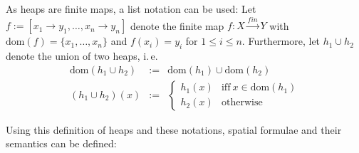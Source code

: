\documentclass{scrartcl}
\theoremstyle{definition}
\newcommand{\dom}{{\text{dom}}}
\newcommand{\tofin}{\xrightarrow{fin}}
\begin{document}
As heaps are finite maps, a list notation can be used:
Let $f := [x_1 \to y_1, \ldots, x_n \to y_n]$ denote the finite map $f : X
\tofin Y$ with $\dom(f) = \{x_1, \ldots, x_n\}$ and
$f(x_i) = y_i$ for $1 \leq i \leq n$.
Furthermore, let $h_1 \cup h_2$ denote the union of two heaps, i.\,e.\
\begin{eqnarray*}
\dom(h_1 \cup h_2) & := & \dom(h_1) \cup \dom(h_2) \\
(h_1 \cup h_2)(x) & := & \left\{
\begin{array}{ll}
  h_1(x) & \text{iff}\ x \in \dom(h_1)\\
  h_2(x) & \text{otherwise}
\end{array}\right.
\end{eqnarray*}

Using this definition of heaps and these notations, spatial formulae and their
semantics can be defined:
\end{document}
